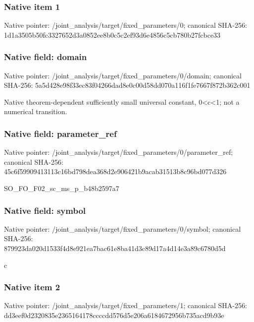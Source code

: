 \documentclass[10pt,a4paper]{article}
\begin{document}
\subsubsection{Native item 1}
Native pointer: /joint\_\allowbreak{}analysis/target/fixed\_\allowbreak{}parameters/0; canonical SHA-256: 1d1a3505b50fc3327652d3a0852ee8b0c5c2ef93d6e4856c5cb780b27fcbce33

\subsubsection{Native field: domain}
Native pointer: /joint\_\allowbreak{}analysis/target/fixed\_\allowbreak{}parameters/0/domain; canonical SHA-256: 5a5d428e98f33ec83f04266dad8e0c00d58dd070a116f1fe7667f872b362c001

\begingroup\raggedright\sloppy Native theorem-dependent sufficiently small universal constant,\allowbreak{} 0<c<1;\allowbreak{} not a numerical transition.\par\endgroup

\subsubsection{Native field: parameter\_\allowbreak{}ref}
Native pointer: /joint\_\allowbreak{}analysis/target/fixed\_\allowbreak{}parameters/0/parameter\_\allowbreak{}ref; canonical SHA-256: 45c6f59909413113c16bd798dea368d2e906421b9acab31513b8c96bd077d326

\begingroup\raggedright\sloppy SO\_\allowbreak{}FO\_\allowbreak{}F02\_\allowbreak{}sc\_\allowbreak{}ms\_\allowbreak{}p\_\allowbreak{}b48b2597a7\par\endgroup

\subsubsection{Native field: symbol}
Native pointer: /joint\_\allowbreak{}analysis/target/fixed\_\allowbreak{}parameters/0/symbol; canonical SHA-256: 879923da020d1533f4d8e921ea7bac61e8ba41d3c89d17a4d14e3a89c6780d5d

\begingroup\raggedright\sloppy c\par\endgroup

\subsubsection{Native item 2}
Native pointer: /joint\_\allowbreak{}analysis/target/fixed\_\allowbreak{}parameters/1; canonical SHA-256: dd3eef0d2320835e2365164178ccccdd576d5e206a6184672956b735acd9b93e
\end{document}
